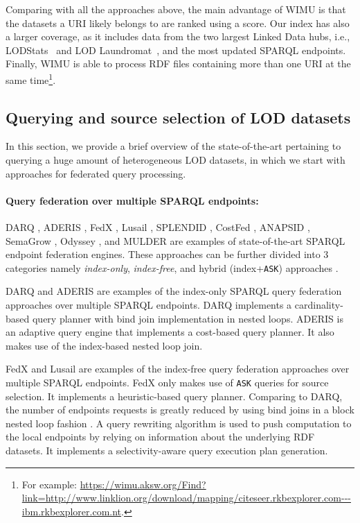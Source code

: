 \documentclass[sw]{iosart2x}
\begin{document}
Comparing with all the approaches above, the main advantage of WIMU is that the datasets a URI likely belongs to are ranked using a score.
Our index has also a larger coverage, as it includes data from the two largest Linked Data hubs, i.e., LODStats~\cite{auer2012lodstats} and LOD Laundromat~\cite{beek2014lod}, and the most updated SPARQL endpoints.
Finally, WIMU is able to process RDF files containing more than one URI at the same time\footnote{For example: \url{https://wimu.aksw.org/Find?link=http://www.linklion.org/download/mapping/citeseer.rkbexplorer.com---ibm.rkbexplorer.com.nt}.}.

\subsection{Querying and source selection of LOD datasets}
In this section, we provide a brief overview of the state-of-the-art pertaining to querying a huge amount of heterogeneous LOD datasets, in which we start with approaches for federated query processing.
\paragraph*{\textbf{Query federation over multiple SPARQL endpoints:}}

DARQ \cite{darq2008}, ADERIS \cite{aderis2011}, FedX \cite{fedx2011}, Lusail \cite{abdelaziz2017lusail}, SPLENDID \cite{splendid2011}, CostFed \cite{saleem2018costfed}, ANAPSID \cite{anapsid2011}, SemaGrow \cite{semagrow2015}, Odyssey \cite{odyssey2017}, and MULDER \cite{endris2018querying} are examples of state-of-the-art SPARQL endpoint federation engines.
These approaches can be further divided into 3 categories namely \emph{index-only}, \emph{index-free}, and hybrid (index+\texttt{ASK}) approaches \cite{saleem2015fine}. 

DARQ and ADERIS are examples of the index-only SPARQL query federation approaches over multiple SPARQL endpoints.
DARQ implements a cardinality-based query planner with bind join implementation in nested loops.
ADERIS is an adaptive query engine that implements a cost-based query planner.
It also makes use of the index-based nested loop join. 

FedX and Lusail are examples of the index-free query federation approaches over multiple SPARQL endpoints. 
FedX only makes use of \texttt{ASK} queries for source selection.
It implements a heuristic-based query planner.
Comparing to DARQ, the number of endpoints requests is greatly reduced by using bind joins in a block nested loop fashion \cite{fedx2011}.
A query rewriting algorithm is used to push computation to the local endpoints by relying on information about the underlying RDF datasets.
It implements a selectivity-aware query execution plan generation. 
\end{document}
